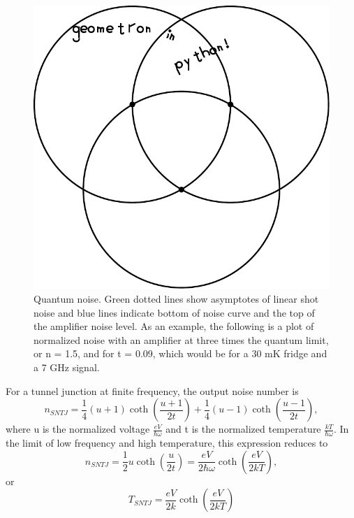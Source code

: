 \documentclass{report}
\begin{document}
\begin{figure}
\includegraphics{foo2.pdf}
\caption{Quantum noise.  Green dotted lines show asymptotes of linear shot noise and blue lines indicate bottom of noise curve and the top of the amplifier noise level.  As an example, the following is a plot of normalized noise with an amplifier at three times the quantum limit, or n = 1.5, and for t = 0.09, which would be for a 30 mK fridge and a 7 GHz signal.}
\end{figure}

 	For a tunnel junction at finite frequency, the output noise number is 
\begin{equation}
n_{SNTJ} = \frac{1}{4}\left( u + 1\right)\coth{\left(\frac{u+1}{2t}\right)} + \frac{1}{4}\left( u - 1 \right)\coth{\left(\frac{u-1}{2t}\right)} ,
\end{equation}
where u is the normalized voltage $\frac{eV}{\hbar\omega}$ and t is the normalized temperature $\frac{kT}{\hbar\omega}$. In the limit of low frequency and high temperature, this expression reduces to 
\begin{equation}
n_{SNTJ} = \frac{1}{2}u\coth{\left(\frac{u}{2t}\right)} = \frac{eV}{2\hbar\omega}\coth{\left(\frac{eV}{2kT}\right)}, 
\end{equation}
or
\begin{equation}
T_{SNTJ} = \frac{eV}{2k}\coth{\left(\frac{eV}{2kT}\right)}
\end{equation}
\end{document}
